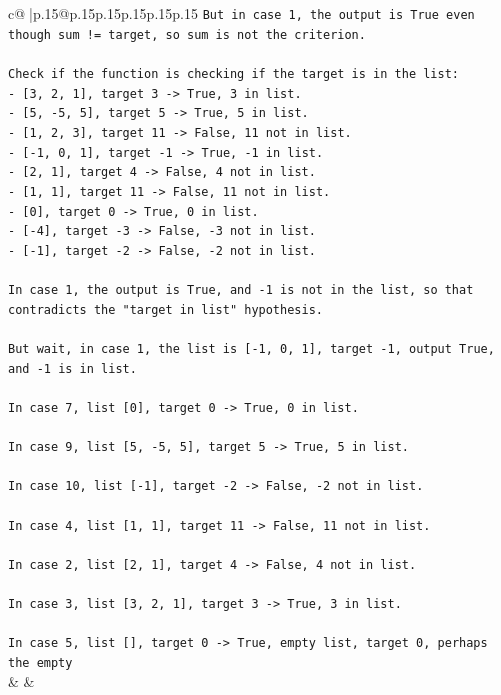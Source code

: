 \documentclass{article}
\begin{document}
{\begin{supertabular}{c@{$\;$}|p{.15\linewidth}@{}p{.15\linewidth}p{.15\linewidth}p{.15\linewidth}p{.15\linewidth}p{.15\linewidth}}
{{{\texttt{But in case 1, the output is True even though sum != target, so sum is not the criterion.} \\
\\ 
\texttt{Check if the function is checking if the target is in the list:} \\
\texttt{{-} {[}3, 2, 1{]}, target 3 {-}> True, 3 in list.} \\
\texttt{{-} {[}5, {-}5, 5{]}, target 5 {-}> True, 5 in list.} \\
\texttt{{-} {[}1, 2, 3{]}, target 11 {-}> False, 11 not in list.} \\
\texttt{{-} {[}{-}1, 0, 1{]}, target {-}1 {-}> True, {-}1 in list.} \\
\texttt{{-} {[}2, 1{]}, target 4 {-}> False, 4 not in list.} \\
\texttt{{-} {[}1, 1{]}, target 11 {-}> False, 11 not in list.} \\
\texttt{{-} {[}0{]}, target 0 {-}> True, 0 in list.} \\
\texttt{{-} {[}{-}4{]}, target {-}3 {-}> False, {-}3 not in list.} \\
\texttt{{-} {[}{-}1{]}, target {-}2 {-}> False, {-}2 not in list.} \\
\\ 
\texttt{In case 1, the output is True, and {-}1 is not in the list, so that contradicts the "target in list" hypothesis.} \\
\\ 
\texttt{But wait, in case 1, the list is {[}{-}1, 0, 1{]}, target {-}1, output True, and {-}1 is in list.} \\
\\ 
\texttt{In case 7, list {[}0{]}, target 0 {-}> True, 0 in list.} \\
\\ 
\texttt{In case 9, list {[}5, {-}5, 5{]}, target 5 {-}> True, 5 in list.} \\
\\ 
\texttt{In case 10, list {[}{-}1{]}, target {-}2 {-}> False, {-}2 not in list.} \\
\\ 
\texttt{In case 4, list {[}1, 1{]}, target 11 {-}> False, 11 not in list.} \\
\\ 
\texttt{In case 2, list {[}2, 1{]}, target 4 {-}> False, 4 not in list.} \\
\\ 
\texttt{In case 3, list {[}3, 2, 1{]}, target 3 {-}> True, 3 in list.} \\
\\ 
\texttt{In case 5, list {[}{]}, target 0 {-}> True, empty list, target 0, perhaps the empty} \\
            }
        }
    }
    & & \\ \\


\end{supertabular}}
\end{document}
